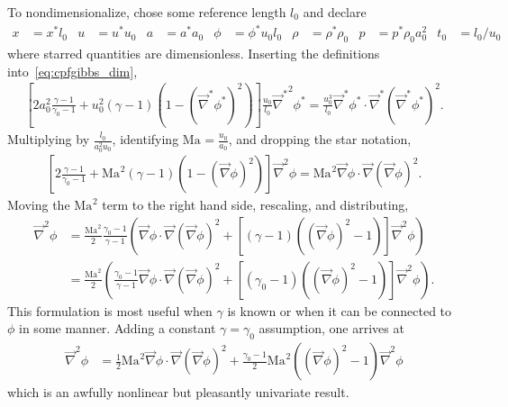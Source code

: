 \documentclass[letterpaper,11pt,nointlimits,reqno]{amsart}
\newcommand{\Mach}[1][]{\ensuremath{\mbox{Ma}_{#1}}}
\begin{document}
To nondimensionalize, chose some reference length $l_0$ and declare
\begin{align}
    x     &= x^\ast l_0
&   u     &= u^\ast u_0
&   a     &= a^\ast a_0
&   \phi  &= \phi^\ast u_0 l_0
&   \rho  &= \rho^\ast \rho_0
&   p     &= p^\ast \rho_0 a_0^2
&   t_0   &= l_0 / u_0
\label{eq:nondimensionalization}
\end{align}
where starred quantities are dimensionless.  Inserting the definitions
into~\eqref{eq:cpfgibbs_dim},
\begin{align}
    \left[
          2a_0^2 \frac{\gamma-1}{\gamma_0-1}
        + u_0^2 \left(\gamma-1\right)
          \left(1 - \left(\vec{\nabla}^\ast\phi^\ast\right)^2\right)
    \right] \frac{u_0}{l_0} {\vec{\nabla}^\ast}^2\phi^\ast
     =       \frac{u_0^3}{l_0} \vec{\nabla}^\ast\phi^\ast
       \cdot \vec{\nabla}^\ast\left(\vec{\nabla}^\ast\phi^\ast\right)^2
.
\end{align}
Multiplying by $\frac{l_0}{a_0^2 u_0}$, identifying $\Mach =
\frac{u_0}{a_0}$, and dropping the star notation,
\begin{align}
    \left[
          2 \frac{\gamma-1}{\gamma_0-1}
        + \Mach^2 \left(\gamma-1\right)
          \left(1 - \left(\vec{\nabla}\phi\right)^2\right)
    \right] {\vec{\nabla}}^2\phi
     =       \Mach^2 \vec{\nabla}\phi
       \cdot \vec{\nabla}\left(\vec{\nabla}\phi\right)^2
.
\end{align}
Moving the $\Mach^2$ term to the right hand side, rescaling, and distributing,
\begin{align}
       {\vec{\nabla}}^2\phi
    &= \frac{\Mach^2}{2}\frac{\gamma_0-1}{\gamma-1} \left(
         \vec{\nabla}\phi \cdot \vec{\nabla}\left(\vec{\nabla}\phi\right)^2
       +
       \left[
             \left(\gamma-1\right)
             \left(\left(\vec{\nabla}\phi\right)^2 - 1\right)
       \right] {\vec{\nabla}}^2\phi
       \right)
\\  &= \frac{\Mach^2}{2} \left(
         \frac{\gamma_0-1}{\gamma-1}
         \vec{\nabla}\phi \cdot \vec{\nabla}\left(\vec{\nabla}\phi\right)^2
       +
       \left[
             \left(\gamma_0-1\right)
             \left(\left(\vec{\nabla}\phi\right)^2 - 1\right)
       \right] {\vec{\nabla}}^2\phi
       \right)
.
\end{align}
This formulation is most useful when $\gamma$ is known or when it can be
connected to $\phi$ in some manner.  Adding a constant $\gamma=\gamma_0$
assumption, one arrives at
\begin{align}
       {\vec{\nabla}}^2\phi
    &=   \frac{1}{2}\Mach^2
         \vec{\nabla}\phi \cdot \vec{\nabla}\left(\vec{\nabla}\phi\right)^2
       +
         \frac{\gamma_0-1}{2}\Mach^2
         \left(\left(\vec{\nabla}\phi\right)^2 - 1\right)
         {\vec{\nabla}}^2\phi
\label{eq:cpfgibbs_nondim}
\end{align}
which is an awfully nonlinear but pleasantly univariate result.
\end{document}
